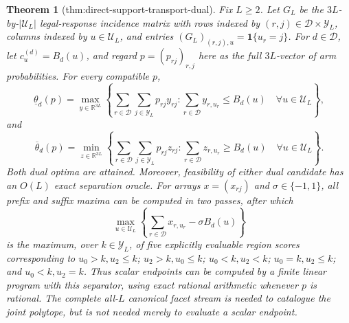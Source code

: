 \documentclass{article}
\newtheorem{theorem}{Theorem}
\begin{document}
\begin{theorem}[thm:direct-support-transport-dual]\label{thm:direct-support-transport-dual}
Fix \(L\ge2\).  Let \(G_L\) be the \(3L\)-by-\(|\mathcal U_L|\) legal-response incidence matrix with rows indexed by \((r,j)\in\mathcal D\times\mathcal Y_L\), columns indexed by \(u\in\mathcal U_L\), and entries \((G_L)_{(r,j),u}=\mathbf 1\{u_r=j\}\).  For \(d\in\mathcal D\), let \(c^{(d)}_u=B_d(u)\), and regard \(p=(p_{rj})_{r,j}\) here as the full \(3L\)-vector of arm probabilities.  For every compatible \(p\),
\[
 \underline\theta_d(p)=
 \max_{y\in\mathbb R^{3L}}
 \left\{\sum_{r\in\mathcal D}\sum_{j\in\mathcal Y_L}p_{rj}y_{rj}:
 \sum_{r\in\mathcal D}y_{r,u_r}\le B_d(u)\quad\forall u\in\mathcal U_L\right\},
\]
and
\[
 \overline\theta_d(p)=
 \min_{z\in\mathbb R^{3L}}
 \left\{\sum_{r\in\mathcal D}\sum_{j\in\mathcal Y_L}p_{rj}z_{rj}:
 \sum_{r\in\mathcal D}z_{r,u_r}\ge B_d(u)\quad\forall u\in\mathcal U_L\right\}.
\]
Both dual optima are attained.  Moreover, feasibility of either dual candidate has an \(O(L)\) exact separation oracle.  For arrays \(x=(x_{rj})\) and \(\sigma\in\{-1,1\}\), all prefix and suffix maxima can be computed in two passes, after which
\[
 \max_{u\in\mathcal U_L}\left\{\sum_{r\in\mathcal D}x_{r,u_r}-\sigma B_d(u)\right\}
\]
is the maximum, over \(k\in\mathcal Y_L\), of five explicitly evaluable region scores corresponding to \(u_0>k,u_2\le k\); \(u_2>k,u_0\le k\); \(u_0<k,u_2<k\); \(u_0=k,u_2\le k\); and \(u_0<k,u_2=k\).  Thus scalar endpoints can be computed by a finite linear program with this separator, using exact rational arithmetic whenever \(p\) is rational.  The complete all-\(L\) canonical facet stream is needed to catalogue the joint polytope, but is not needed merely to evaluate a scalar endpoint.
\end{theorem}
\end{document}
